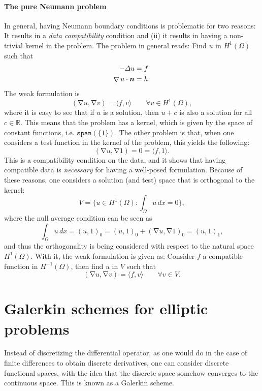 \documentclass{article}
\renewcommand{\vec}{\vectorsym}
\DeclareMathOperator{\grad}{\nabla}
\newcommand{\R}{\mathbb{R}}
\begin{document}
\paragraph{The pure Neumann problem} In general, having Neumann boundary conditions is problematic for two reasons: It results in a \emph{data compatibility} condition and (ii) it results in having a non-trivial kernel in the problem. The problem in general reads: Find $u$ in $H^1(\Omega)$ such that
    $$ \begin{aligned}
        -\Delta u &= f \\
        \grad u \cdot \vec n &= h.
       \end{aligned}
    $$
The weak formulation is 
    $$ (\grad u, \grad v) = \langle f, v \rangle \qquad \forall v\in H^1(\Omega),$$
where it is easy to see that if $u$ is a solution, then $u+c$ is also a solution for all $c\in \R$. This means that the problem has a kernel, which is given by the space of constant functions, i.e. $\texttt{span}(\{1\})$. The other problem is that, when one considers a test function in the kernel of the problem, this yields the following: 
    $$ (\grad u, \grad 1) = 0 = \langle f, 1\rangle. $$
This is a compatibility condition on the data, and it shows that having compatible data is \emph{necessary} for having a well-posed formulation. Because of these reasons, one considers a solution (and test) space that is orthogonal to the kernel: 
    $$ V = \{u\in H^1(\Omega): \int_\Omega u \,dx = 0\}, $$
where the null average condition can be seen as 
    $$ \int_\Omega u \,dx = (u, 1)_0 = (u,1)_0 + (\grad u, \grad 1)_0 = (u, 1)_1, $$
and thus the orthogonality is being considered with respect to the natural space $H^1(\Omega)$. With it, the weak formulation is given as: Consider $f$ a compatible function in $H^{-1}(\Omega)$, then find $u$ in $V$ such that
    $$ (\grad u, \grad v) = \langle f, v\rangle \qquad \forall v\in V. $$

\section{Galerkin schemes for elliptic problems}
Instead of discretizing the differential operator, as one would do in the case of finite differences to obtain discrete derivatives, one can consider discrete functional spaces, with the idea that the discrete space somehow converges to the continuous space. This is known as a Galerkin scheme.  
\end{document}

